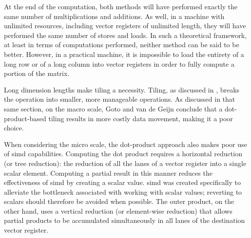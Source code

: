 \documentclass[\main/thesis.tex]{subfiles}
\begin{document}
At the end of the computation, both methods will have performed exactly the same number of multiplications and additions.
As well, in a machine with unlimited resources, including vector registers of unlimited length, they will have performed the same number of stores and loads.
In such a theoretical framework, at least in terms of computations performed, neither method can be said to be better.
However, in a practical machine, it is impossible to load the entirety of a long row or of a long column into vector registers in order to fully compute a portion of the matrix.

Long dimension lengths make tiling a necessity.
Tiling, as discussed in , breaks the operation into smaller, more manageable operations.
As discussed in that same section, on the macro scale, Goto and van de Geijn conclude that a dot-product-based tiling results in more costly data movement, making it a poor choice.

When considering the micro scale, the dot-product approach also makes poor use of \gls{simd} capabilities.
Computing the dot product requires a horizontal reduction (or tree reduction): the reduction of all the \glspl{lane} of a vector register into a single scalar element.
Computing a partial result in this manner reduces the effectiveness of \gls{simd} by creating a scalar value.
\Gls{simd} was created specifically to alleviate the bottleneck associated with working with scalar values; reverting to scalars should therefore be avoided when possible.
The outer product, on the other hand, uses a vertical reduction (or element-wise reduction) that allows partial products to be accumulated simultaneously in all \glspl{lane} of the destination vector register.
\end{document}
